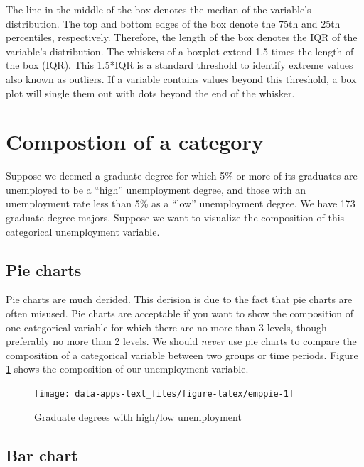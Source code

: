 \documentclass[
]{book}
\begin{document}
The line in the middle of the box denotes the median of the variable's distribution. The top and bottom edges of the box denote the 75th and 25th percentiles, respectively. Therefore, the length of the box denotes the IQR of the variable's distribution. The whiskers of a boxplot extend 1.5 times the length of the box (IQR). This 1.5*IQR is a standard threshold to identify extreme values also known as outliers. If a variable contains values beyond this threshold, a box plot will single them out with dots beyond the end of the whisker.

\hypertarget{compostion-of-a-category}{%
\section{Compostion of a category}\label{compostion-of-a-category}}

Suppose we deemed a graduate degree for which 5\% or more of its graduates are unemployed to be a ``high'' unemployment degree, and those with an unemployment rate less than 5\% as a ``low'' unemployment degree. We have 173 graduate degree majors. Suppose we want to visualize the composition of this categorical unemployment variable.

\hypertarget{pie-charts}{%
\subsection{Pie charts}\label{pie-charts}}

Pie charts are much derided. This derision is due to the fact that pie charts are often misused. Pie charts are acceptable if you want to show the composition of one categorical variable for which there are no more than 3 levels, though preferably no more than 2 levels. We should \emph{never} use pie charts to compare the composition of a categorical variable between two groups or time periods. Figure \ref{fig:emppie} shows the composition of our unemployment variable.

\begin{figure}

{\centering \texttt{[image: data-apps-text\_files/figure-latex/emppie-1]} 

}

\caption{Graduate degrees with high/low unemployment}\label{fig:emppie}
\end{figure}

\hypertarget{bar-chart}{%
\subsection{Bar chart}\label{bar-chart}}
\end{document}
